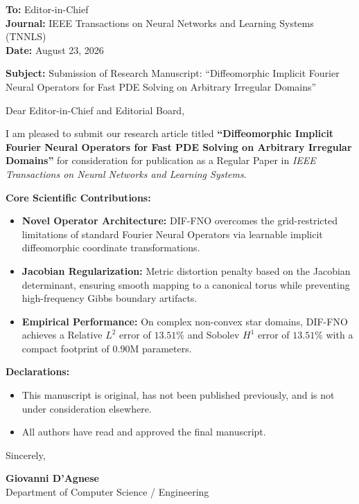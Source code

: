 \documentclass[11pt]{article}
\begin{document}
\noindent \textbf{To:} Editor-in-Chief \\
\textbf{Journal:} IEEE Transactions on Neural Networks and Learning Systems (TNNLS) \\
\textbf{Date:} August 23, 2026

\vspace{0.5cm}
\noindent \textbf{Subject:} Submission of Research Manuscript: ``Diffeomorphic Implicit Fourier Neural Operators for Fast PDE Solving on Arbitrary Irregular Domains''

\vspace{0.5cm}
\noindent Dear Editor-in-Chief and Editorial Board,

\vspace{0.3cm}
I am pleased to submit our research article titled \textbf{``Diffeomorphic Implicit Fourier Neural Operators for Fast PDE Solving on Arbitrary Irregular Domains''} for consideration for publication as a Regular Paper in \textit{IEEE Transactions on Neural Networks and Learning Systems}.

\vspace{0.3cm}
\noindent \textbf{Core Scientific Contributions:}
\begin{itemize}
    \item \textbf{Novel Operator Architecture:} DIF-FNO overcomes the grid-restricted limitations of standard Fourier Neural Operators via learnable implicit diffeomorphic coordinate transformations.
    \item \textbf{Jacobian Regularization:} Metric distortion penalty based on the Jacobian determinant, ensuring smooth mapping to a canonical torus while preventing high-frequency Gibbs boundary artifacts.
    \item \textbf{Empirical Performance:} On complex non-convex star domains, DIF-FNO achieves a Relative $L^2$ error of $13.51\%$ and Sobolev $H^1$ error of $13.51\%$ with a compact footprint of $0.90\text{M}$ parameters.
\end{itemize}

\vspace{0.3cm}
\noindent \textbf{Declarations:}
\begin{itemize}
    \item This manuscript is original, has not been published previously, and is not under consideration elsewhere.
    \item All authors have read and approved the final manuscript.
\end{itemize}

\vspace{0.5cm}
\noindent Sincerely,

\vspace{0.3cm}
\noindent \textbf{Giovanni D'Agnese} \\
Department of Computer Science / Engineering
\end{document}
